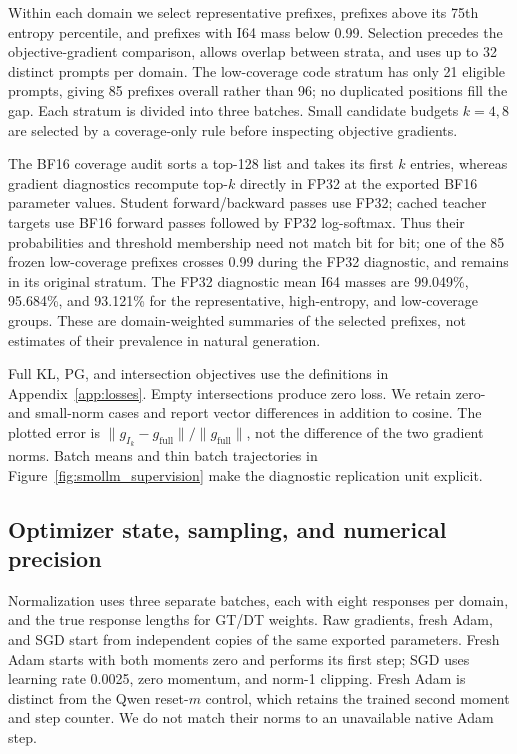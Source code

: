 Within each domain we select representative prefixes, prefixes above its 75th entropy percentile, and prefixes with I64 mass below 0.99. Selection precedes the objective-gradient comparison, allows overlap between strata, and uses up to 32 distinct prompts per domain. The low-coverage code stratum has only 21 eligible prompts, giving 85 prefixes overall rather than 96; no duplicated positions fill the gap. Each stratum is divided into three batches. Small candidate budgets $k=4,8$ are selected by a coverage-only rule before inspecting objective gradients.

The BF16 coverage audit sorts a top-128 list and takes its first $k$ entries, whereas gradient diagnostics recompute top-$k$ directly in FP32 at the exported BF16 parameter values. Student forward/backward passes use FP32; cached teacher targets use BF16 forward passes followed by FP32 log-softmax. Thus their probabilities and threshold membership need not match bit for bit; one of the 85 frozen low-coverage prefixes crosses 0.99 during the FP32 diagnostic, and remains in its original stratum. The FP32 diagnostic mean I64 masses are 99.049\%, 95.684\%, and 93.121\% for the representative, high-entropy, and low-coverage groups. These are domain-weighted summaries of the selected prefixes, not estimates of their prevalence in natural generation.

Full KL, PG, and intersection objectives use the definitions in Appendix~\ref{app:losses}. Empty intersections produce zero loss. We retain zero- and small-norm cases and report vector differences in addition to cosine. The plotted error is $\|g_{I_k}-g_{\mathrm{full}}\|/\|g_{\mathrm{full}}\|$, not the difference of the two gradient norms. Batch means and thin batch trajectories in Figure~\ref{fig:smollm_supervision} make the diagnostic replication unit explicit.

\subsection{Optimizer state, sampling, and numerical precision}
\label{app:smollm_controls}

Normalization uses three separate batches, each with eight responses per domain, and the true response lengths for GT/DT weights. Raw gradients, fresh Adam, and SGD start from independent copies of the same exported parameters. Fresh Adam starts with both moments zero and performs its first step; SGD uses learning rate 0.0025, zero momentum, and norm-1 clipping. Fresh Adam is distinct from the Qwen reset-$m$ control, which retains the trained second moment and step counter. We do not match their norms to an unavailable native Adam step.

